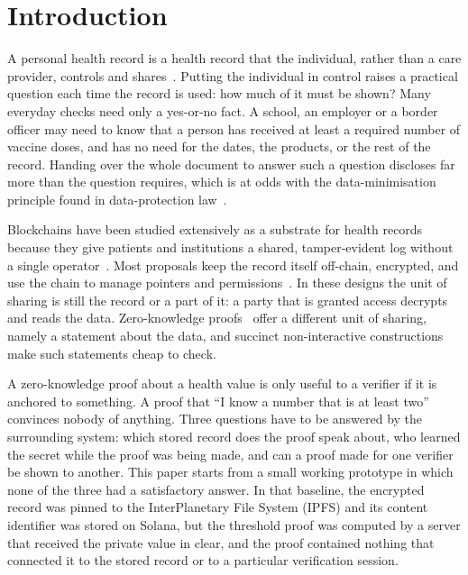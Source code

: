 
\section{Introduction}\label{sec:intro}

A personal health record is a health record that the individual, rather than
a care provider, controls and shares~\cite{tang2006phr,roehrs2017phr}. Putting
the individual in control raises a practical question each time the record is
used: how much of it must be shown? Many everyday checks need only a yes-or-no
fact. A school, an employer or a border officer may need to know that a person
has received at least a required number of vaccine doses, and has no need for
the dates, the products, or the rest of the record. Handing over the whole
document to answer such a question discloses far more than the question
requires, which is at odds with the data-minimisation principle found in
data-protection law~\cite{gdpr2016}.

Blockchains have been studied extensively as a substrate for health records
because they give patients and institutions a shared, tamper-evident log
without a single operator~\cite{kuo2017blockchain,mcghin2019blockchain}. Most
proposals keep the record itself off-chain, encrypted, and use the chain to
manage pointers and permissions~\cite{azaria2016medrec,zyskind2015decentralizing,dagher2018ancile,xia2017medshare,shahnaz2019ehr,sun2020ipfs}.
In these designs the unit of sharing is still the record or a part of it: a
party that is granted access decrypts and reads the data. Zero-knowledge
proofs~\cite{goldwasser1989} offer a different unit of sharing, namely a
statement about the data, and succinct non-interactive
constructions~\cite{parno2013pinocchio,groth2016} make such statements cheap
to check.

A zero-knowledge proof about a health value is only useful to a verifier if
it is anchored to something. A proof that ``I know a number that is at least
two'' convinces nobody of anything. Three questions have to be answered by
the surrounding system: which stored record does the proof speak about, who
learned the secret while the proof was being made, and can a proof made for
one verifier be shown to another. This paper starts from a small working
prototype in which none of the three had a satisfactory answer. In that
baseline, the encrypted record was pinned to the InterPlanetary File System
(IPFS) and its content identifier was stored on Solana, but the threshold
proof was computed by a server that received the private value in clear, and
the proof contained nothing that connected it to the stored record or to a
particular verification session.


